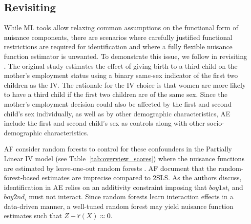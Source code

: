 \subsection{Revisiting \citet{angrist1998children}}\label{sec:angrist_evans}

While ML tools allow relaxing common assumptions on the functional form of nuisance components, there are scenarios where carefully justified functional restrictions are required for identification and where a fully flexible nuisance function estimator is unwanted. To demonstrate this issue, we follow \citet[][henceforth AF]{angrist2022} in revisiting \citet[][henceforth AE]{angrist1998children}. The original study estimates the effect of giving birth to a third child on the mother's employment status using a binary same-sex indicator of the first two children as the IV. The rationale for the IV choice is that women are more likely to have a third child if the first two children are of the same sex. Since the mother's employment decision could also be affected by the first and second child's sex individually, as well as by other demographic characteristics, AE include the first and second child's sex as controls along with other socio-demographic characteristics. %

AF consider random forests to control for these confounders in the Partially Linear IV model (see Table~\ref{tab:overview_scores}) where the nuisance functions are estimated by leave-one-out random forests \citep{athey2019generalized}. AF document that the random-forest-based estimates are imprecise compared to 2SLS. As the authors discuss, identification in AE relies on an additivity constraint imposing that $boy1st_i$ and $boy2nd_i$ must not interact. Since random forests learn interaction effects in a data-driven manner, a well-tuned random forest may yield nuisance function estimates such that $Z-\hat{r}(X)\approx 0$.

